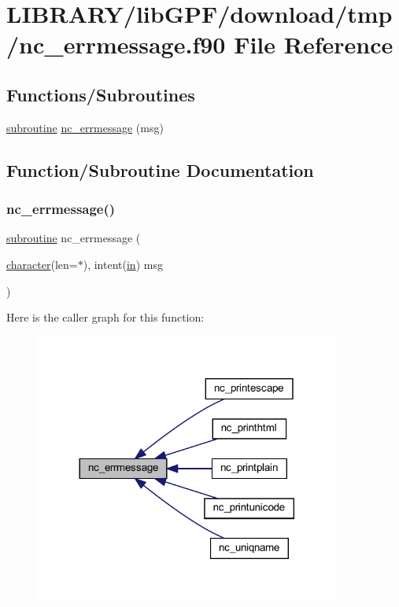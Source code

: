 \hypertarget{nc__errmessage_8f90}{}\section{L\+I\+B\+R\+A\+R\+Y/lib\+G\+P\+F/download/tmp/nc\+\_\+errmessage.f90 File Reference}
\label{nc__errmessage_8f90}
\subsection*{Functions/\+Subroutines}
\begin{DoxyCompactItemize}
\item 
\hyperlink{M__stopwatch_83_8txt_acfbcff50169d691ff02d4a123ed70482}{subroutine} \hyperlink{nc__errmessage_8f90_ade6780c0b4bcaa3cecf07e3a5bcbeeee}{nc\+\_\+errmessage} (msg)
\end{DoxyCompactItemize}


\subsection{Function/\+Subroutine Documentation}
\mbox{\label{nc__errmessage_8f90_ade6780c0b4bcaa3cecf07e3a5bcbeeee}} 
\subsubsection{\texorpdfstring{nc\+\_\+errmessage()}{nc\_errmessage()}}
{\footnotesize\ttfamily \hyperlink{M__stopwatch_83_8txt_acfbcff50169d691ff02d4a123ed70482}{subroutine} nc\+\_\+errmessage (\begin{DoxyParamCaption}\item[{\hyperlink{option__stopwatch_83_8txt_abd4b21fbbd175834027b5224bfe97e66}{character}(len=$\ast$), intent(\hyperlink{M__journal_83_8txt_afce72651d1eed785a2132bee863b2f38}{in})}]{msg }\end{DoxyParamCaption})}

Here is the caller graph for this function\+:
\nopagebreak
\begin{figure}[H]
\begin{center}
\leavevmode
\includegraphics[width=284pt]{nc__errmessage_8f90_ade6780c0b4bcaa3cecf07e3a5bcbeeee_icgraph}
\end{center}
\end{figure}
